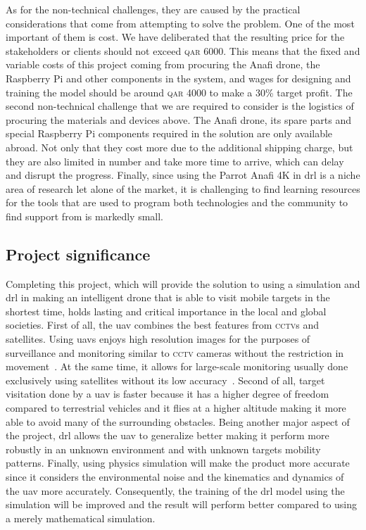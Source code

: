 \documentclass[../main.tex]{subfiles}
\begin{document}
As for the non-technical challenges, they are caused
by the practical considerations that come
from attempting to solve the problem.
One of the most important of them is cost. 
We have deliberated that
the resulting price for the stakeholders or clients
should not exceed \textsc{qar} 6000. 
This means that the fixed and variable costs of this project
coming from procuring the Anafi drone, the Raspberry Pi and other
components in the system, 
and wages for designing and training the model
should be around \textsc{qar} 4000 to make a 30\% target profit.
The second non-technical challenge that we are required to consider
is the logistics of procuring the materials and devices above.
The Anafi drone, its spare parts and special Raspberry Pi
components required in the solution are only available abroad.
Not only that they cost more due to the additional shipping charge,
but they are also limited in number 
and take more time to arrive, which can delay 
and disrupt the progress.
Finally, since using the Parrot Anafi 4K in \gls{drl}
is a niche area of research let alone of the market,
it is challenging to find learning resources for the tools
that are used to program both technologies
and the community to find support from is markedly small.

\subsection{Project significance}

Completing this project, which will provide the solution
to using a simulation and \gls{drl} in making an intelligent drone 
that is able to visit mobile targets in the shortest time,
holds lasting and critical importance 
in the local and global societies.
First of all, the \gls{uav} combines the best features
from \textsc{cctv}s and satellites.
Using \glspl{uav} enjoys high resolution images
for the purposes of surveillance and monitoring
similar to \textsc{cctv} cameras 
without the restriction in movement~\cite{Sha19}.
At the same time, it allows for large-scale monitoring 
usually done exclusively using satellites 
without its low accuracy~\cite{Sha19}.
Second of all, target visitation done by a \gls{uav}
is faster because it has a higher degree of freedom
compared to terrestrial vehicles and
it flies at a higher altitude 
making it more able to avoid 
many of the surrounding obstacles.
Being another major aspect of the project, \gls{drl} 
allows the \gls{uav} to generalize better
making it perform more robustly
in an unknown environment
and with unknown targets mobility patterns.
Finally, using physics simulation will make the product 
more accurate since it considers 
the environmental noise and
the kinematics and dynamics of the \gls{uav} more accurately.
Consequently, the training of the \gls{drl} model 
using the simulation will be improved 
and the result will perform better
compared to using a merely mathematical simulation.
\end{document}
